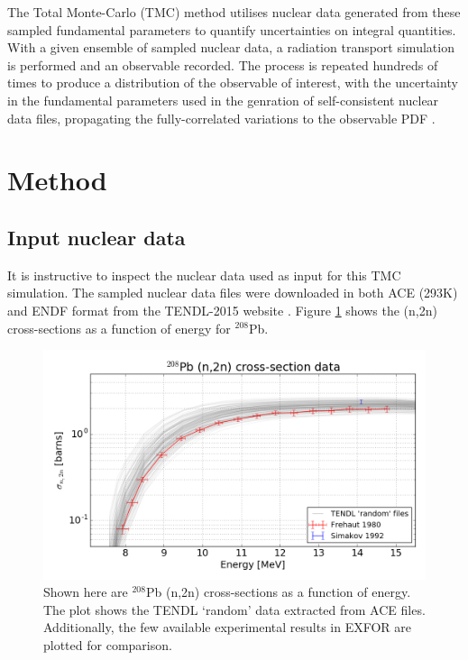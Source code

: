 The Total Monte-Carlo (TMC) method utilises nuclear data generated from these sampled fundamental parameters to quantify uncertainties on integral quantities. With a given ensemble of sampled nuclear data, a radiation transport simulation is performed and an observable recorded. The process is repeated hundreds of times to produce a distribution of the observable of interest, with the uncertainty in the fundamental parameters used in the genration of self-consistent nuclear data files, propagating the fully-correlated variations to the observable PDF \cite{Koning2008}.

\section{Method}

\subsection{Input nuclear data}
\label{sec:data}
It is instructive to inspect the nuclear data used as input for this TMC simulation. The sampled nuclear data files were downloaded in both ACE (293K) and ENDF format from the TENDL-2015 website \cite{TENDL2015}. Figure \ref{fig:tendl_lead} shows the (n,2n) cross-sections as a function of energy for $^{208}$Pb. 



\begin{figure}
  \centering
  \includegraphics[width=\textwidth]{pb208_n2n_tendl_exfor.png}
  \caption{Shown here are $^{208}$Pb (n,2n) cross-sections as a function of energy. The plot shows the TENDL `random' data extracted from ACE files. Additionally, the few available experimental results in EXFOR are plotted for comparison.}
  \label{fig:tendl_lead}
\end{figure}

